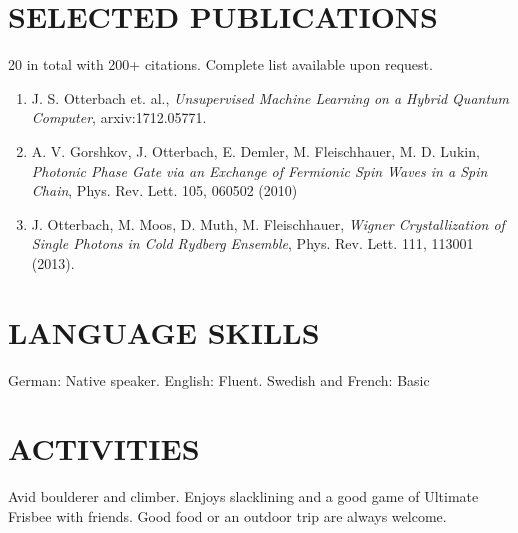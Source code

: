\documentclass[10pt,centered]{./res} %
\begin{document}
\begin{resume}
\section{\color{ResumeBlue}SELECTED PUBLICATIONS}
\vspace*{0.2cm}
20 in total with 200+ citations. Complete list available upon request.\vspace*{.2cm}
\begin{enumerate}
 \item J. S. Otterbach et. al., \textit{Unsupervised Machine Learning on a Hybrid Quantum Computer}, arxiv:1712.05771.
 \item A. V. Gorshkov, J. Otterbach, E. Demler, M. Fleischhauer, M. D. Lukin, \textit{Photonic Phase Gate via an Exchange of Fermionic Spin Waves in a Spin Chain}, Phys. Rev. Lett. 105, 060502 (2010)
 \item {J. Otterbach}, M. Moos, D. Muth, M. Fleischhauer, \textit{Wigner Crystallization of Single Photons in Cold Rydberg Ensemble}, Phys. Rev. Lett. {111}, 113001 (2013).

\end{enumerate}

\section{\color{ResumeBlue}LANGUAGE SKILLS}
\vspace*{0.2cm}
German: Native speaker. English: Fluent. Swedish and French: Basic

\section{\color{ResumeBlue}ACTIVITIES}
\vspace*{0.2cm}
Avid boulderer and climber. Enjoys slacklining and a good game of Ultimate Frisbee with friends. Good food or an outdoor trip are always welcome.

\end{resume}
\end{document}

